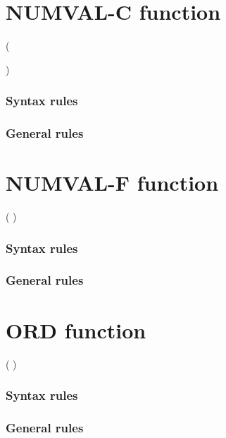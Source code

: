 \section{NUMVAL-C function}

\begin{syntax}
    ( \argument
  \begin{0-1}
    \argument
  \end{0-1}
  )
\end{syntax}

\subsubsection{Syntax rules}

\subsubsection{General rules}

\section{NUMVAL-F function}

\begin{syntax}
    ( \argument )
\end{syntax}

\subsubsection{Syntax rules}

\subsubsection{General rules}

\section{ORD function}

\begin{syntax}
    ( \argument )
\end{syntax}

\subsubsection{Syntax rules}

\subsubsection{General rules}

